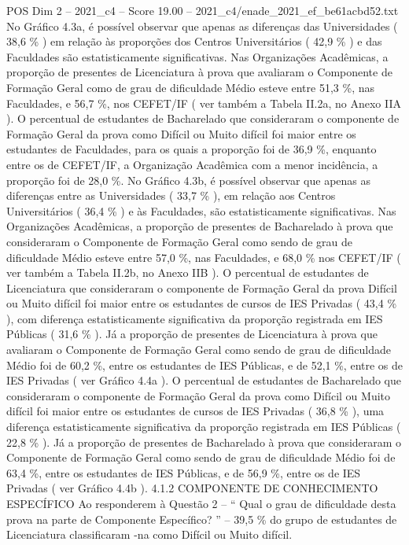 \begin{textsample}{POS Dim 2 – 2021\_c4 – Score 19.00 – 2021\_c4/enade\_2021\_ef\_be61acbd52.txt}
No Gráfico 4.3a, é possível observar que apenas as diferenças das Universidades ( 38,6 \% ) em relação às proporções dos Centros Universitários ( 42,9 \% ) e das Faculdades são estatisticamente significativas.
Nas Organizações Acadêmicas, a proporção de presentes de Licenciatura à prova que avaliaram o Componente de Formação Geral como de grau de dificuldade Médio esteve entre 51,3 \%, nas Faculdades, e 56,7 \%, nos CEFET/IF ( ver também a Tabela II.2a, no Anexo IIA ).
O percentual de estudantes de Bacharelado que consideraram o componente de Formação Geral da prova como Difícil ou Muito difícil foi maior entre os estudantes de Faculdades, para os quais a proporção foi de 36,9 \%, enquanto entre os de CEFET/IF, a Organização Acadêmica com a menor incidência, a proporção foi de 28,0 \%.
No Gráfico 4.3b, é possível observar que apenas as diferenças entre as Universidades ( 33,7 \% ), em relação aos Centros Universitários ( 36,4 \% ) e às Faculdades, são estatisticamente significativas.
Nas Organizações Acadêmicas, a proporção de presentes de Bacharelado à prova que consideraram o Componente de Formação Geral como sendo de grau de dificuldade Médio esteve entre 57,0 \%, nas Faculdades, e 68,0 \% nos CEFET/IF ( ver também a Tabela II.2b, no Anexo IIB ).
O percentual de estudantes de Licenciatura que consideraram o componente de Formação Geral da prova Difícil ou Muito difícil foi maior entre os estudantes de cursos de IES Privadas ( 43,4 \% ), com diferença estatisticamente significativa da proporção registrada em IES Públicas ( 31,6 \% ).
Já a proporção de presentes de Licenciatura à prova que avaliaram o Componente de Formação Geral como sendo de grau de dificuldade Médio foi de 60,2 \%, entre os estudantes de IES Públicas, e de 52,1 \%, entre os de IES Privadas ( ver Gráfico 4.4a ).
O percentual de estudantes de Bacharelado que consideraram o componente de Formação Geral da prova como Difícil ou Muito difícil foi maior entre os estudantes de cursos de IES Privadas ( 36,8 \% ), uma diferença estatisticamente significativa da proporção registrada em IES Públicas ( 22,8 \% ).
Já a proporção de presentes de Bacharelado à prova que consideraram o Componente de Formação Geral como sendo de grau de dificuldade Médio foi de 63,4 \%, entre os estudantes de IES Públicas, e de 56,9 \%, entre os de IES Privadas ( ver Gráfico 4.4b ). 4.1.2 COMPONENTE DE CONHECIMENTO ESPECÍFICO Ao responderem à Questão 2 – “ Qual o grau de dificuldade desta prova na parte de Componente Específico? ” – 39,5 \% do grupo de estudantes de Licenciatura classificaram -na como Difícil ou Muito difícil.

\end{textsample}
